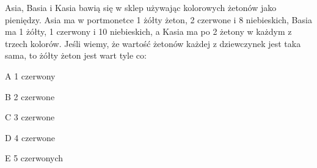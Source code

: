 \begin{tresc}
Asia, Basia i Kasia bawią się w sklep używając kolorowych żetonów jako pieniędzy. Asia ma w portmonetce 1 żółty żeton, 2 czerwone i 8 niebieskich, Basia ma 1 żółty, 1 czerwony i 10 niebieskich, a Kasia ma po 2 żetony w każdym z trzech kolorów. Jeśli wiemy, że wartość żetonów każdej z dziewczynek jest taka sama, to żółty żeton jest wart tyle co:
\end{tresc}
\begin{wariant}{A} 1 czerwony \end{wariant}
\begin{wariant}{B} 2 czerwone \end{wariant}
\begin{wariant}{C} 3 czerwone \end{wariant}
\begin{wariant}{D} 4 czerwone \end{wariant}
\begin{wariant}{E} 5 czerwonych \end{wariant}
